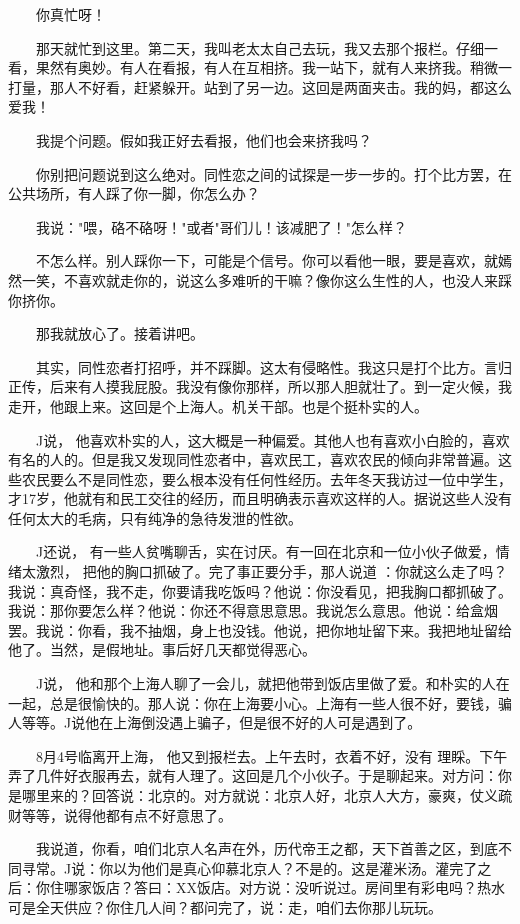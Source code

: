  　　你真忙呀！ 
 
 　　那天就忙到这里。第二天，我叫老太太自己去玩，我又去那个报栏。仔细一看，果然有奥妙。有人在看报，有人在互相挤。我一站下，就有人来挤我。稍微一打量，那人不好看，赶紧躲开。站到了另一边。这回是两面夹击。我的妈，都这么爱我！ 
 
 　　我提个问题。假如我正好去看报，他们也会来挤我吗？ 
 
 　　你别把问题说到这么绝对。同性恋之间的试探是一步一步的。打个比方罢，在公共场所，有人踩了你一脚，你怎么办？ 
 
 　　我说："喂，硌不硌呀！"或者"哥们儿！该减肥了！"怎么样？ 
 
 　　不怎么样。别人踩你一下，可能是个信号。你可以看他一眼，要是喜欢，就嫣然一笑，不喜欢就走你的，说这么多难听的干嘛？像你这么生性的人，也没人来踩你挤你。 
 
 　　那我就放心了。接着讲吧。 
 
 　　其实，同性恋者打招呼，并不踩脚。这太有侵略性。我这只是打个比方。言归正传，后来有人摸我屁股。我没有像你那样，所以那人胆就壮了。到一定火候，我走开，他跟上来。这回是个上海人。机关干部。也是个挺朴实的人。 
 
 　　J说， 他喜欢朴实的人，这大概是一种偏爱。其他人也有喜欢小白脸的，喜欢有名的人的。但是我又发现同性恋者中，喜欢民工，喜欢农民的倾向非常普遍。这些农民要么不是同性恋，要么根本没有任何性经历。去年冬天我访过一位中学生，才17岁，他就有和民工交往的经历，而且明确表示喜欢这样的人。据说这些人没有任何太大的毛病，只有纯净的急待发泄的性欲。 
 
 　　J还说， 有一些人贫嘴聊舌，实在讨厌。有一回在北京和一位小伙子做爱，情绪太激烈， 把他的胸口抓破了。完了事正要分手，那人说道 ：你就这么走了吗？我说：真奇怪，我不走，你要请我吃饭吗？他说：你没看见，把我胸口都抓破了。我说：那你要怎么样？他说：你还不得意思意思。我说怎么意思。他说：给盒烟罢。我说：你看，我不抽烟，身上也没钱。他说，把你地址留下来。我把地址留给他了。当然，是假地址。事后好几天都觉得恶心。 
 
 　　J说， 他和那个上海人聊了一会儿，就把他带到饭店里做了爱。和朴实的人在一起，总是很愉快的。那人说：你在上海要小心。上海有一些人很不好，要钱，骗人等等。J说他在上海倒没遇上骗子，但是很不好的人可是遇到了。 
 
 　　8月4号临离开上海， 他又到报栏去。上午去时，衣着不好，没有 理睬。下午弄了几件好衣服再去，就有人理了。这回是几个小伙子。于是聊起来。对方问：你是哪里来的？回答说：北京的。对方就说：北京人好，北京人大方，豪爽，仗义疏财等等，说得他都有点不好意思了。 
 
 　　我说道，你看，咱们北京人名声在外，历代帝王之都，天下首善之区，到底不同寻常。J说：你以为他们是真心仰慕北京人？不是的。这是灌米汤。灌完了之后：你住哪家饭店？答曰：XX饭店。对方说：没听说过。房间里有彩电吗？热水可是全天供应？你住几人间？都问完了，说：走，咱们去你那儿玩玩。 
 
